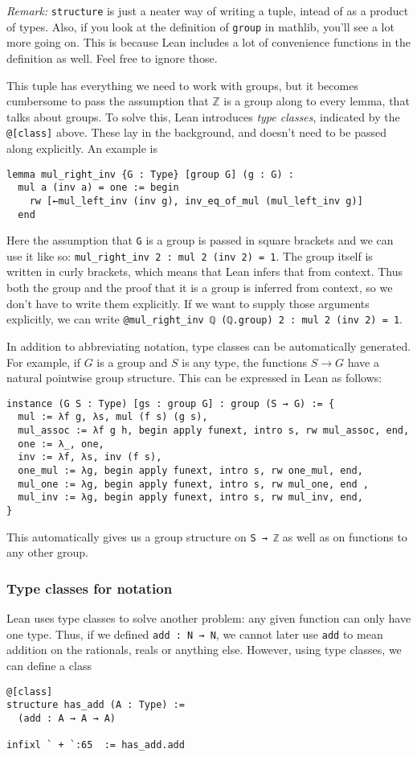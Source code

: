 \documentclass[a4paper, 12pt]{article}
\newcommand{\Z}{\mathbb{Z}}
\newcommand{\lean}[1]{\texttt{#1}}
\theoremstyle{changedot}
\theoremstyle{changedotbreak}
\theoremstyle{nonumberplain}
\begin{document}
\textit{Remark:} \lean{structure} is just a neater way of writing a tuple, intead of as a product of types. Also, if you look at the definition of \lean{group} in mathlib, you'll see a lot more going on. This is because Lean includes a lot of convenience functions in the definition as well. Feel free to ignore those.

This tuple has everything we need to work with groups, but it becomes cumbersome to pass the assumption that $\Z$ is a group along to every lemma, that talks about groups. To solve this, Lean introduces \textit{type classes}, indicated by the \lean{@[class]} above. These lay in the background, and doesn't need to be passed along explicitly. An example is
\begin{verbatim}
lemma mul_right_inv {G : Type} [group G] (g : G) :
  mul a (inv a) = one := begin
    rw [←mul_left_inv (inv g), inv_eq_of_mul (mul_left_inv g)]
  end
\end{verbatim}
Here the assumption that \lean{G} is a group is passed in square brackets and we can use it like so: \lean{mul_right_inv 2 : mul 2 (inv 2) = 1}. The group itself is written in curly brackets, which means that Lean infers that from context. Thus both the group and the proof that it is a group is inferred from context, so we don't have to write them explicitly. If we want to supply those arguments explicitly, we can write \lean{@mul_right_inv ℚ (ℚ.group) 2 : mul 2 (inv 2) = 1}.

In addition to abbreviating notation, type classes can be automatically generated. For example, if $G$ is a group and $S$ is any type, the functions $S \to G$ have a natural pointwise group structure. This can be expressed in Lean as follows:

\begin{verbatim}
instance (G S : Type) [gs : group G] : group (S → G) := {
  mul := λf g, λs, mul (f s) (g s),
  mul_assoc := λf g h, begin apply funext, intro s, rw mul_assoc, end,
  one := λ_, one,
  inv := λf, λs, inv (f s),
  one_mul := λg, begin apply funext, intro s, rw one_mul, end,
  mul_one := λg, begin apply funext, intro s, rw mul_one, end ,
  mul_inv := λg, begin apply funext, intro s, rw mul_inv, end,
}
\end{verbatim}

This automatically gives us a group structure on \lean{S → ℤ} as well as on functions to any other group. 

\subsubsection{Type classes for notation}
Lean uses type classes to solve another problem: any given function can only have one type. Thus, if we defined \lean{add : N → N}, we cannot later use \lean{add} to mean addition on the rationals, reals or anything else. However, using type classes, we can define a class
\begin{verbatim}
@[class]
structure has_add (A : Type) :=
  (add : A → A → A)

infixl ` + `:65  := has_add.add
\end{verbatim}
\end{document}
